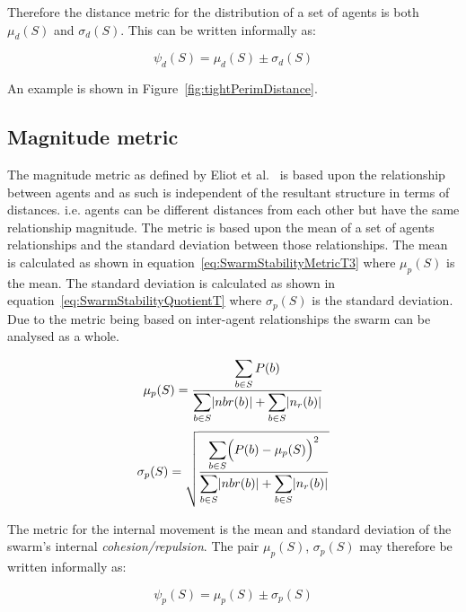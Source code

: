 \documentclass[12pt,a4paper]{IEEEtran}
\newcommand{\card}[1]{\vert{#1}\vert}
\begin{document}
Therefore the distance metric for the distribution of a set of agents is both $\mu_d(S)$ and $\sigma_d(S)$. This can be written informally as:

\small
\begin{equation}
\label{eq:SwarmPotentialMagnitude}
\psi_d(S) = \mu_d(S)\pm \sigma_d(S)
\end{equation}
\normalsize

An example is shown in Figure~\ref{fig:tightPerimDistance}.

\subsection{Magnitude metric}
The magnitude metric as defined by Eliot et al.~\cite{eliot2018metric} is based upon the relationship between agents and as such is independent of the resultant structure in terms of distances. i.e. agents can be different distances from each other but have the same relationship magnitude.
The metric is based upon the mean of a set of agents relationships and the standard deviation between those relationships. The mean is calculated as shown in equation~\ref{eq:SwarmStabilityMetricT3} where $\mu_p(S)$ is the mean. The standard deviation is calculated as shown in equation~\ref{eq:SwarmStabilityQuotientT} where $\sigma_p(S)$ is the standard deviation. Due to the metric being based on inter-agent relationships the swarm can be analysed as a whole.

\small
\begin{equation}
\label{eq:SwarmStabilityMetricT3}
\mu_p(S) = \frac{\mathlarger{\sum_{b \in S} P(b)}}{\mathlarger{\sum_{b \in S}}\card{nbr(b)} + \mathlarger{\sum_{b \in S}}\card{n_r(b)}}
\end{equation}
\normalsize
\small
\begin{equation}
\label{eq:SwarmStabilityQuotientT}
\sigma_p(S) = \sqrt{\frac{\mathlarger{\sum_{b \in S}}\Big(P(b)-\mu_p(S)\Big)^2}{\mathlarger{\sum_{b \in S}}\card{nbr(b)} + \mathlarger{\sum_{b \in S}}\card{n_r(b)}}}
\end{equation}
\normalsize

The metric for the internal movement is the mean and standard deviation of the swarm's internal \emph{cohesion/repulsion}. The pair $\mu_p(S)$, $\sigma_p(S)$ may therefore be written informally as: 

\small
\begin{equation}
\label{eq:SwarmMagnitudeMatric}
\psi_p(S) = \mu_p(S)\pm \sigma_p(S)
\end{equation}
\normalsize
\end{document}
